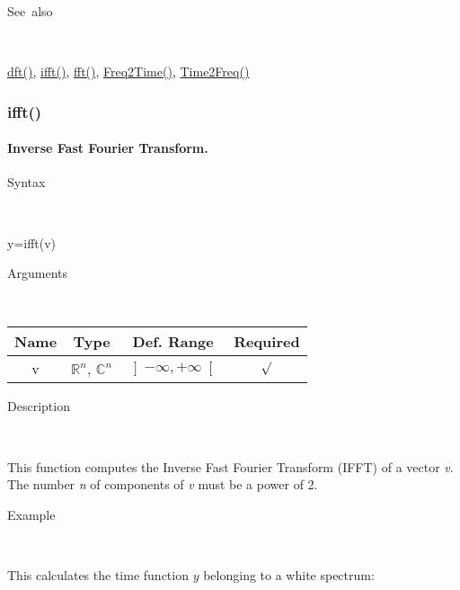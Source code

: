 \begin{description}
\item [See~also]~
\end{description}
\textcolor{blue}{\hyperlink{dft}{dft()}}\textcolor{black}{,} \textcolor{blue}{\hyperlink{ifft}{ifft()}}\textcolor{black}{,}
\textcolor{blue}{\hyperlink{fft}{fft()}}\textcolor{black}{,}
\textcolor{blue}{\hyperlink{Freq2Time}{Freq2Time()}}\textcolor{black}{,}
\textcolor{blue}{\hyperlink{Time2Freq}{Time2Freq()}}


\newpage
\subsubsection*{\hypertarget{ifft}{}{\Large ifft()}}


\paragraph{\label{par:Inverse-Fast-Fourier}Inverse Fast Fourier Transform.}

\begin{description}
\item [Syntax]~
\end{description}
y=ifft(v)

\begin{description}
\item [Arguments]~
\end{description}
\begin{tabular}{|c|c|c|c|}
\hline 
Name&
Type&
Def. Range&
Required\tabularnewline
\hline
\hline 
v&
$\mathbb{R}^{n}$, $\mathbb{C}^{n}$&
$\left]-\infty,+\infty\right[$&
$\surd$\tabularnewline
\hline 
\end{tabular}

\begin{description}
\item [Description]~
\end{description}
This function computes the Inverse Fast Fourier Transform (IFFT) of a
vector \textit{v}.  The number \textit{n} of components of \textit{v}
must be a power of 2.

\begin{description}
\item [Example]~
\end{description}
This calculates the time function $y$ belonging to a white spectrum:

